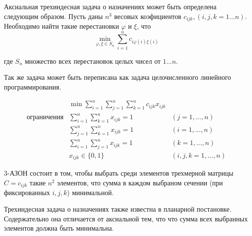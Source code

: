 Аксиальная трехиндесная задача о назначениях может быть определена следующим образом. 
Пусть даны $n^3$ весовых коэфициентов $c_{ijk}, (i,j,k=1 \ldots n)$. 
Необходимо найти такие перестановки $\varphi$ и $\xi$, что 
\[
  \min_{\varphi, \xi \in S_n} \sum^n_{i = 1} c_{i \varphi (i) \xi(i)}
\]

где $S_n$ множество всех перестановок целых чисел от $1 \ldots n$.

Так же задача может быть переписана как задача целочисленного линейного программирования. 

\begin{eqnarray*}
  & \min \displaystyle \sum^n_{i = 1} \displaystyle \sum^n_{j = 1} \displaystyle \sum^n_{k = 1}
  c_{ijk} x_{ijk} \\
  \text{ограничения}
  &\displaystyle \sum^n_{i = 1} \displaystyle \sum^n_{k = 1} x_{ijk} = 1  &(j = 1, \ldots, n) \\
  &\displaystyle \sum^n_{j = 1} \displaystyle \sum^n_{k = 1} x_{ijk} = 1  &(i = 1, \ldots, n) \\
  &\displaystyle \sum^n_{i = 1} \displaystyle \sum^n_{j = 1} x_{ijk} = 1  &(k = 1, \ldots, n) \\
  & x_{ijk} \in \{ 0, 1 \} &(i,j,k = 1, \ldots, n)
\end{eqnarray*}

3-АЗОН состоит в том, чтобы выбрать среди элементов трехмерной матрицы $C={c_{ijk}}$ такие $n^2$ элементов, что сумма в каждом выбраном сечении (при фиксированных $i,j,k$) минимальной. 

Трехиндесная задача о назначениях также известна в планарной постановке. Содержательно она отличается от аксиальной тем, что что сумма всех выбранных элементов должна быть минимальна. 
